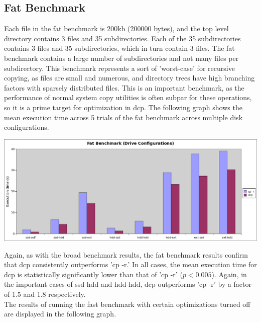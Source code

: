 \documentclass[12pt]{article}
\begin{document}
\subsection{Fat Benchmark}
Each file in the fat benchmark is 200kb (200000 bytes), and
the top level directory contains 3 files and 35 subdirectories. Each
of the 35 subdirectories contains 3 files and 35 subdirectories, which in turn contain 3 files.
The fat benchmark contains a large number of subdirectories and not many files per subdirectory.
This benchmark represents a sort of 'worst-case' for recursive copying, as files are small and numerous,
and directory trees have high branching factors with sparsely distributed files. This is an important
benchmark, as the performance of normal system copy utilities is often subpar for these operations,
so it is a prime target for optimization in dcp.
The following graph shows the mean execution time across 5 trials of the fat benchmark across multiple disk configurations. \\

\vspace{5mm}

\includegraphics[width=500pt]{report/graphs/fat-manydisk.png}

\vspace{5mm}

Again, as with the broad benchmark results, the fat benchmark results confirm that
dcp consistently outperforms 'cp -r.' In all cases, the mean execution time for
dcp is statistically significantly lower than that of 'cp -r' ($p < 0.005$).
Again, in the important cases of ssd-hdd and hdd-hdd, dcp outperforms 'cp -r'
by a factor of 1.5 and 1.8 respectively. \\

The results of running the fast benchmark with certain optimizations turned
off are displayed in the following graph.\\

\vspace{5mm}
\end{document}
